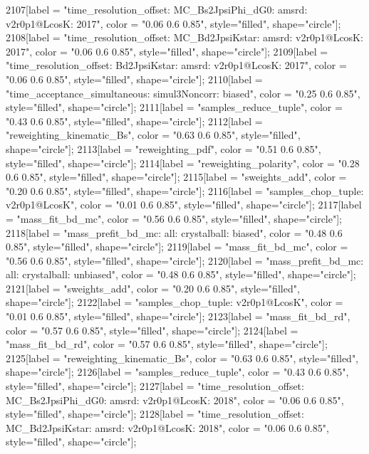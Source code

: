 {	2107[label = "time_resolution_offset\nmode: MC_Bs2JpsiPhi_dG0\ntimeres: amsrd\nversion: v2r0p1@LcosK\nyear: 2017", color = "0.06 0.6 0.85", style="filled", shape="circle"];
	2108[label = "time_resolution_offset\nmode: MC_Bd2JpsiKstar\ntimeres: amsrd\nversion: v2r0p1@LcosK\nyear: 2017", color = "0.06 0.6 0.85", style="filled", shape="circle"];
	2109[label = "time_resolution_offset\nmode: Bd2JpsiKstar\ntimeres: amsrd\nversion: v2r0p1@LcosK\nyear: 2017", color = "0.06 0.6 0.85", style="filled", shape="circle"];
	2110[label = "time_acceptance_simultaneous\ntimeacc: simul3Noncorr\ntrigger: biased", color = "0.25 0.6 0.85", style="filled", shape="circle"];
	2111[label = "samples_reduce_tuple", color = "0.43 0.6 0.85", style="filled", shape="circle"];
	2112[label = "reweighting_kinematic_Bs", color = "0.63 0.6 0.85", style="filled", shape="circle"];
	2113[label = "reweighting_pdf", color = "0.51 0.6 0.85", style="filled", shape="circle"];
	2114[label = "reweighting_polarity", color = "0.28 0.6 0.85", style="filled", shape="circle"];
	2115[label = "sweights_add", color = "0.20 0.6 0.85", style="filled", shape="circle"];
	2116[label = "samples_chop_tuple\nversion: v2r0p1@LcosK", color = "0.01 0.6 0.85", style="filled", shape="circle"];
	2117[label = "mass_fit_bd_mc", color = "0.56 0.6 0.85", style="filled", shape="circle"];
	2118[label = "mass_prefit_bd_mc\nmassbin: all\nmassmodel: crystalball\ntrigger: biased", color = "0.48 0.6 0.85", style="filled", shape="circle"];
	2119[label = "mass_fit_bd_mc", color = "0.56 0.6 0.85", style="filled", shape="circle"];
	2120[label = "mass_prefit_bd_mc\nmassbin: all\nmassmodel: crystalball\ntrigger: unbiased", color = "0.48 0.6 0.85", style="filled", shape="circle"];
	2121[label = "sweights_add", color = "0.20 0.6 0.85", style="filled", shape="circle"];
	2122[label = "samples_chop_tuple\nversion: v2r0p1@LcosK", color = "0.01 0.6 0.85", style="filled", shape="circle"];
	2123[label = "mass_fit_bd_rd", color = "0.57 0.6 0.85", style="filled", shape="circle"];
	2124[label = "mass_fit_bd_rd", color = "0.57 0.6 0.85", style="filled", shape="circle"];
	2125[label = "reweighting_kinematic_Bs", color = "0.63 0.6 0.85", style="filled", shape="circle"];
	2126[label = "samples_reduce_tuple", color = "0.43 0.6 0.85", style="filled", shape="circle"];
	2127[label = "time_resolution_offset\nmode: MC_Bs2JpsiPhi_dG0\ntimeres: amsrd\nversion: v2r0p1@LcosK\nyear: 2018", color = "0.06 0.6 0.85", style="filled", shape="circle"];
	2128[label = "time_resolution_offset\nmode: MC_Bd2JpsiKstar\ntimeres: amsrd\nversion: v2r0p1@LcosK\nyear: 2018", color = "0.06 0.6 0.85", style="filled", shape="circle"];
}
